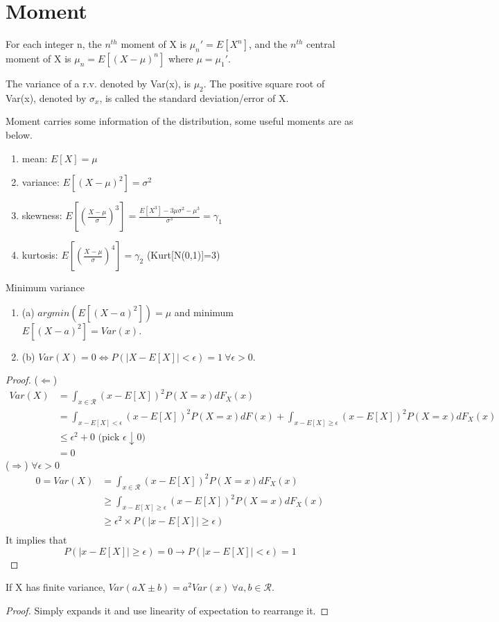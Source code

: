 \documentclass[../Transformation.tex]{subfiles}
\begin{document}
\section{Moment}
\begin{definition}
For each integer n, the $n^{th}$ moment of X is $\mu_n'=E[X^n]$, and the $n^{th}$ central moment of X is $\mu_n=E[(X-\mu)^n]$ where $\mu=\mu_1'$.
\end{definition}
\begin{definition}
The variance of a r.v. denoted by Var(x), is $\mu_2$. The positive square root of Var(x), denoted by $\sigma_x$, is called the standard deviation/error of X.  
\end{definition}
Moment carries some information of the distribution, some useful moments are as below. 
\begin{enumerate}
\item mean: $E[X]=\mu$
\item variance: $E[(X-\mu)^2]=\sigma^2$
\item skewness: $E[(\frac{X-\mu}{\sigma})^3]=\frac{E[X^3]-3\mu\sigma^2-\mu^3}{\sigma^3}=\gamma_1$
\item kurtosis: $E[(\frac{X-\mu}{\sigma})^4]=\gamma_2$     \hspace{3pt} (Kurt[N(0,1)]=3)
\end{enumerate}
\begin{property} Minimum variance 
\begin{enumerate}
		\item(a) $argmin(E[(X-a)^2])=\mu$ and minimum $E[(X-a)^2]=Var(x).$
		\item(b) $Var(X)=0\Leftrightarrow P(|X-E[X]|<\epsilon)=1\ \forall\epsilon>0$. 
\end{enumerate}
	\begin{proof}
	($\Leftarrow$)
	\begin{align*}
	Var(X)&=\int_{x\in\mathcal{R}}(x-E[X])^2P(X=x)dF_X(x)\\
	&=\int_{x-E[X]<\epsilon}(x-E[X])^2P(X=x)dF(x)+\int_{x-E[X]\geq\epsilon}(x-E[X])^2P(X=x)dF_X(x)\\
	&\leq \epsilon^2 +0 \mbox{       (pick $\epsilon\downarrow 0)$}\\
	&=0
	\end{align*}
	($\Rightarrow$) $\forall\epsilon>0$
		\begin{align*}
	0=Var(X)&=\int_{x\in\mathcal{R}}(x-E[X])^2P(X=x)dF_X(x)\\
	&\geq\int_{x-E[X]\geq\epsilon}(x-E[X])^2P(X=x)dF_X(x)\\
	&\geq \epsilon^2\times P(|x-E[X]|\geq\epsilon)\\
	\end{align*}
	It implies that
	$$P(|x-E[X]|\geq\epsilon)=0\rightarrow P(|x-E[X]|< \epsilon)=1$$
	\end{proof}
\end{property}
\begin{property}If X has finite variance, $Var(aX\pm b)=a^2Var(x)\ \forall a,b\in\mathcal{R}.$
\end{property}
\begin{proof}
Simply expands it and use linearity of expectation to rearrange it.
\end{proof}
\end{document}
